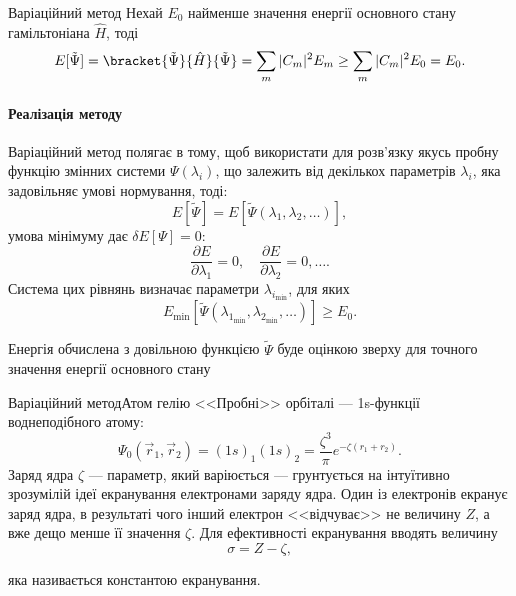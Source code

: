 \documentclass[10pt]{beamer}
\begin{document}
\begin{frame}{Варіаційний метод}{}
{		Нехай $E_0$ найменше  значення енергії основного стану гамільтоніана $\hat{H}$, тоді
		\begin{equation*}
			E[\tilde\Psi]  = \bracket{\tilde\Psi}{\hat{H}}{\tilde\Psi} = \sum\limits_m |C_m|^2 E_m \ge \sum\limits_m |C_m|^2 E_0  = E_0.
		\end{equation*}
	}
	\only<3>%
	{    \framesubtitle<3>{Реалізація методу}
		Варіаційний метод полягає в тому, щоб використати для розв'язку якусь пробну функцію змінних системи  $\Psi (\lambda_i)$, що залежить від декількох параметрів $\lambda_i$, яка задовільняє умові нормування, тоді:
		\[
			E[\tilde\Psi]  = E[\tilde\Psi(\lambda_1, \lambda_2, \ldots)],
		\]
		умова мінімуму дає $\delta E[\Psi] = 0$:
		\[
			\frac{\partial E}{\partial \lambda_1} = 0, \quad \frac{\partial E}{\partial \lambda_2} = 0, \ldots.
		\]
		Система цих рівнянь визначає параметри $\lambda_{i_{\min}}$, для яких
		\[
			E_{\min}[\tilde\Psi(\lambda_{1_{\min}}, \lambda_{2_{\min}}, \ldots)] \ge E_0.
		\]
		\begin{alertblock}{}\centering
			Енергія обчислена з довільною функцією $\tilde\Psi$  буде оцінкою зверху для точного значення енергії основного стану
		\end{alertblock}
	}
\end{frame}





\begin{frame}{Варіаційний метод}{Атом гелію}
	<<Пробні>> орбіталі --- 1s-функції воднеподібного атому:
	\begin{equation*}\label{coordinate_ground_state_parahelium}
		\Psi_0(\vec{r}_1, \vec{r}_2) = (1s)_1(1s)_2 = \frac{\zeta^{3}}{\pi}e^{-\zeta(r_1 + r_2)}.
	\end{equation*}
	Заряд ядра $\zeta$ --- параметр, який варіюється --- грунтується на інтуїтивно зрозумілій ідеї \alert{екранування} електронами заряду ядра. {\scriptsize Один із електронів екранує заряд ядра, в результаті чого інший електрон <<відчуває>> не величину $Z$, а вже дещо менше її значення $\zeta$. Для ефективності екранування вводять величину}
	\begin{equation*}
		\sigma = Z - \zeta,
	\end{equation*}

	яка називається \alert{константою екранування}.
\end{frame}
\end{document}
